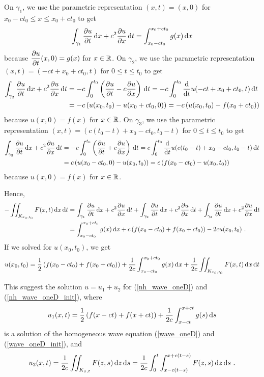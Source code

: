 On $\gamma_1$, we use the parametric representation $(x,t) = (x,0)$ for
$x_0-ct_0 \leq x \leq x_0+ct_0$ to get
\[
\int_{\gamma_1} \pdydx{u}{t} \dx{x} + c^2 \pdydx{u}{x} \dx{t}
= \int_{x_0-ct_0}^{x_0+ct_0} g(x) \dx{x}
\]
because $\displaystyle \pdydx{u}{t}(x,0) = g(x)$ for $x\in \RR$.
On $\gamma_2$, we use the parametric representation
$(x,t) = (-ct+x_0+ct_0,t)$ for $0 \leq t \leq t_0$ to get
\begin{align*}
\int_{\gamma_2} \pdydx{u}{t} \dx{x} + c^2 \pdydx{u}{x} \dx{t}
& = -c \int_0^{t_0} \left( \pdydx{u}{t} - c \pdydx{u}{x} \right) \dx{t}
= -c \int_0^{t_0} \dfdx{u(-ct+x_0+ct_0,t)}{t} \dx{t} \\
& = -c \left( u(x_0,t_0) - u(x_0+ct_0,0) \right)
=  -c \left( u(x_0,t_0) - f(x_0+ct_0) \right)
\end{align*}
because $\displaystyle u(x,0) = f(x)$ for $x \in \RR$.
On $\gamma_3$, we use the parametric representation
$(x,t) = (c(t_0-t)+x_0-ct_0,t_0-t)$ for 
$0 \leq t \leq t_0$ to get
\begin{align*}
\int_{\gamma_3} \pdydx{u}{t} \dx{x} + c^2 \pdydx{u}{x} \dx{t}
& = -c \int_0^{t_0} \left( \pdydx{u}{t} + c \pdydx{u}{x} \right) \dx{t}
= c \int_0^{t_0} \dfdx{u(c(t_0-t)+x_0-ct_0,t_0-t)}{t} \dx{t} \\
& = c \left( u(x_0-ct_0,0) - u(x_0,t_0) \right)
= c \left( f(x_0-ct_0) -u(x_0,t_0) \right)
\end{align*}
because $\displaystyle u(x,0) = f(x)$ for $x \in \RR$.

Hence,
\begin{align*}
-\iint_{K_{x_0,t_0}} F(x,t) \dx{x}\dx{t} &
= \int_{\gamma_1} \pdydx{u}{t} \dx{x} + c^2 \pdydx{u}{x} \dx{t}
+ \int_{\gamma_2} \pdydx{u}{t} \dx{x} + c^2 \pdydx{u}{x} \dx{t}
+ \int_{\gamma_3} \pdydx{u}{t} \dx{x} + c^2 \pdydx{u}{x} \dx{t} \\
&= \int_{x_0-ct_0}^{x_0+ct_0} g(x) \dx{x} 
+ c \left( f(x_0-ct_0) +  f(x_0+ct_0) \right) -2c u(x_0,t_0) \ .
\end{align*}
If we solved for $u(x_0,t_0)$, we get
\[
u(x_0,t_0) = \frac{1}{2} \left(f(x_0-ct_0) + f(x_0+ct_0)\right)
+ \frac{1}{2c} \int_{x_0-ct_0}^{x_0+ct_0} g(x)\dx{x}
+ \frac{1}{2c} \iint_{K_{x_0,t_0}} F(x,t) \dx{x}\dx{t}
\]

This suggest the solution $u = u_1 + u_2$ for
(\ref{nh_wave_oneD}) and (\ref{nh_wave_oneD_init}), where
\[
u_1(x,t) = \frac{1}{2} \left(f(x-ct) + f(x+ct)\right)
+ \frac{1}{2c} \int_{x-ct}^{x+ct} g(s)\dx{s} 
\]
is a solution of the homogeneous wave equation (\ref{wave_oneD}) and
(\ref{wave_oneD_init}), and
\[
u_2(x,t) = \frac{1}{2c} \iint_{K_{x,t}} F(z,s) \dx{z}\dx{s}
= \frac{1}{2c} \int_0^t \int_{x-c(t-s)}^{x+c(t-s)} F(z,s)\dx{z}\dx{s} \ .
\]

